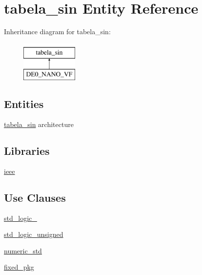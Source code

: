 \hypertarget{classtabela__sin}{}\section{tabela\+\_\+sin Entity Reference}
\label{classtabela__sin}
Inheritance diagram for tabela\+\_\+sin\+:\begin{figure}[H]
\begin{center}
\leavevmode
\includegraphics[height=2.000000cm]{classtabela__sin}
\end{center}
\end{figure}
\subsection*{Entities}
\begin{DoxyCompactItemize}
\item 
\hyperlink{classtabela__sin_1_1tabela__sin}{tabela\+\_\+sin} architecture
\end{DoxyCompactItemize}
\subsection*{Libraries}
 \begin{DoxyCompactItemize}
\item 
\hyperlink{classtabela__sin_a0a6af6eef40212dbaf130d57ce711256}{ieee} 
\end{DoxyCompactItemize}
\subsection*{Use Clauses}
 \begin{DoxyCompactItemize}
\item 
\hyperlink{classtabela__sin_acd03516902501cd1c7296a98e22c6fcb}{std\+\_\+logic\+\_}   
\item 
\hyperlink{classtabela__sin_a598da929e807d58939b47499e8bc9fa8}{std\+\_\+logic\+\_\+unsigned}   
\item 
\hyperlink{classtabela__sin_a2edc34402b573437d5f25fa90ba4013e}{numeric\+\_\+std}   
\item 
\hyperlink{classtabela__sin_aad86249c80e8c1e7ee1c4748aba748e3}{fixed\+\_\+pkg}   
\end{DoxyCompactItemize}
